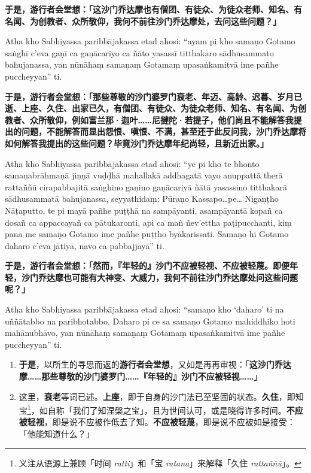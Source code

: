\textbf{于是，游行者会堂想：「这沙门乔达摩也有僧团、有徒众、为徒众老师、知名、有名闻、为创教者、众所敬仰，我何不前往沙门乔达摩处，去问这些问题？」}

Atha kho Sabhiyassa paribbājakassa etad ahosi: “ayam pi kho samaṇo Gotamo saṅghī c’eva gaṇī ca gaṇācariyo ca ñāto yasassī titthakaro sādhusammato bahujanassa, yan nūnāhaṃ samaṇaṃ Gotamaṃ upasaṅkamitvā ime pañhe puccheyyan” ti.

\textbf{于是，游行者会堂想：「那些尊敬的沙门婆罗门衰老、年迈、高龄、迟暮、岁月已逝、上座、久住、出家已久，有僧团、有徒众、为徒众老师、知名、有名闻、为创教者、众所敬仰，例如富兰那·迦叶……尼揵陀·若提子，他们尚且不能解答我提出的问题，不能解答而显出怨恨、嗔恨、不满，甚至还于此反问我，沙门乔达摩将如何解答我提出的这些问题？毕竟沙门乔达摩年纪尚轻，且新近出家。」}

Atha kho Sabhiyassa paribbājakassa etad ahosi: “ye pi kho te bhonto samaṇabrāhmaṇā jiṇṇā vuḍḍhā mahallakā addhagatā vayo anuppattā therā rattaññū cirapabbajitā saṅghino gaṇino gaṇācariyā ñātā yasassino titthakarā sādhusammatā bahujanassa, seyyathidaṃ: Pūraṇo Kassapo…pe… Nigaṇṭho Nāṭaputto, te pi mayā pañhe puṭṭhā na sampāyanti, asampāyantā kopañ ca dosañ ca appaccayañ ca pātukaronti, api ca mañ ñev’ettha paṭipucchanti, kiṃ pana me samaṇo Gotamo ime pañhe puṭṭho byākarissati. Samaṇo hi Gotamo daharo c’eva jātiyā, navo ca pabbajjāyā” ti.

\textbf{于是，游行者会堂想：「然而，『年轻的』沙门不应被轻视、不应被轻蔑。即便年轻，沙门乔达摩也可能有大神变、大威力，我何不前往沙门乔达摩处问这些问题呢？」}

Atha kho Sabhiyassa paribbājakassa etad ahosi: “samaṇo kho ‘daharo’ ti na uññātabbo na paribhotabbo. Daharo pi ce sa samaṇo Gotamo mahiddhiko hoti mahānubhāvo, yan nūnāhaṃ samaṇaṃ Gotamaṃ upasaṅkamitvā ime pañhe puccheyyan” ti.

\begin{enumerate}\item \textbf{于是}，以所生的寻思而返的\textbf{游行者会堂想}，又如是再再审视：「\textbf{这沙门乔达摩……那些尊敬的沙门婆罗门……『年轻的』沙门不应被轻视……}」
\item 这里，\textbf{衰老}等词已述。\textbf{上座}，即于自身的沙门法已至坚固的状态。\textbf{久住}，即知宝\footnote{义注从语源上兼顾「时间 \textit{ratti}」和「宝 \textit{ratana}」来解释「久住 \textit{rattaññū}」。}，如自称「我们了知涅槃之宝」，且为世间认可，或是晓得许多时间。\textbf{不应被轻视}，即是说不应被作低去了知。\textbf{不应被轻蔑}，即是说不应被如是接受：「他能知道什么？」\end{enumerate}

